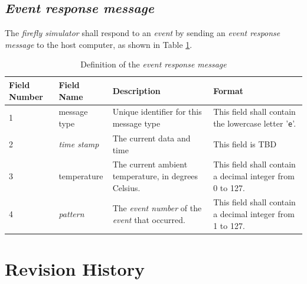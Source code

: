 \documentclass[letterpaper,11pt]{article}
\begin{document}
\subsection{\textit{Event response message}}

The \textit{firefly simulator} shall respond to an \textit{event}
by sending an \textit{event response message} to the host computer,
as shown in Table \ref{tab:EventResponse}.

\begin{table}[H]
  \caption{Definition of the \textit{event response message}}
  \centering
  \setlength\extrarowheight{2pt}
  \begin{tabular}[h]{|p{0.5in}|p{1.00in}|p{2.25in}|p{2.25in}|} \hline
    Field Number & Field Name & Description & Format \\ \hline
    1            & message type

    & Unique identifier for this message type
    & This field shall contain the lowercase letter '\texttt{e}'.
    \\ \hline
    2            & \textit{time stamp}
    & The current data and time
    & This field is TBD
    \\ \hline
    3            & temperature
    & The current ambient temperature, in degrees Celsius.
    & This field shall contain a decimal integer from 0 to 127.
    \\ \hline
    4            & \textit{pattern}

    & The \textit{event number} of the \textit{event} that occurred.
    & This field shall contain a decimal integer from 1 to 127.
    \\ \hline
  \end{tabular}
  \label{tab:EventResponse}
\end{table}

\section{Revision History}
\end{document}
